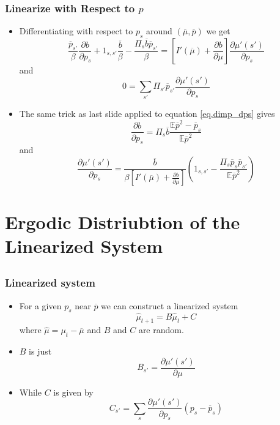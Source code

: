 \documentclass{beamer}
\newcommand{\EE}{\mathbb E}
\newcommand{\pbar}{{\overline p}}
\newcommand{\bbar}{{\overline b}}
\newcommand{\mubar}{{\overline \mu}}
\begin{document}
\begin{frame}
	\frametitle{Linearize with Respect to $p$}
	\begin{itemize}
		\item  Differentiating with respect to $p_s$ around $(\mubar,\pbar)$ we get
		\begin{equation}\label{eq.dimp_dps}
			\frac{\pbar_{s'}}{\beta}\frac{\partial b}{\partial p_s} + 1_{s,s'}\frac{\bbar}{\beta} - \frac{\Pi_s\bbar\pbar_{s'}}{\beta} = \left[I'(\mubar) + \frac{\partial b}{\partial \mu}\right]\frac{\partial \mu'(s')}{\partial p_s}
		\end{equation}and 
		\[
			0 = \sum_{s'}\Pi_{s'}\pbar_{s'}\frac{\partial\mu'(s')}{\partial p_s}
		\]
		\item  The same trick as last slide applied to equation \eqref{eq.dimp_dps} gives
		\begin{equation}
			\frac{\partial b}{\partial p_s} = \Pi_s\bbar \frac{\EE\pbar^2-\pbar_s}{\EE\pbar^2}
		\end{equation}and
		\begin{equation}
	\frac{\partial \mu'(s')}{\partial p_s} = \frac{\bbar}{\beta\left[I '(\mubar) + \frac{\partial b}{\partial \mu}\right]}\left(1_{s,s'}-\frac{\Pi_s\pbar_s\pbar_{s'}}{\EE\pbar^2}\right)
\end{equation}
	\end{itemize}
\end{frame}

\section{Ergodic Distriubtion of the Linearized System}
\subsection{}
\begin{frame}
	\frametitle{Linearized system} 
	\begin{itemize}
		\item  For a given $p_s$ near $\pbar$ we can construct a linearized system
		\[
			\hat\mu_{t+1} = B\hat \mu_t + C
		\]where $\hat\mu = \mu_t -\mubar$ and $B$ and $C$ are random.
		\item  $B$ is just 
		\[
			B_{s'} = \frac{\partial \mu'(s')}{\partial \mu}
		\]
		\item While $C$ is given by
		\[
			C_{s'} = \sum_s \frac{\partial \mu'(s')}{\partial p_s}(p_s-\pbar_s)
		\]
	\end{itemize}
\end{frame}
\end{document}

